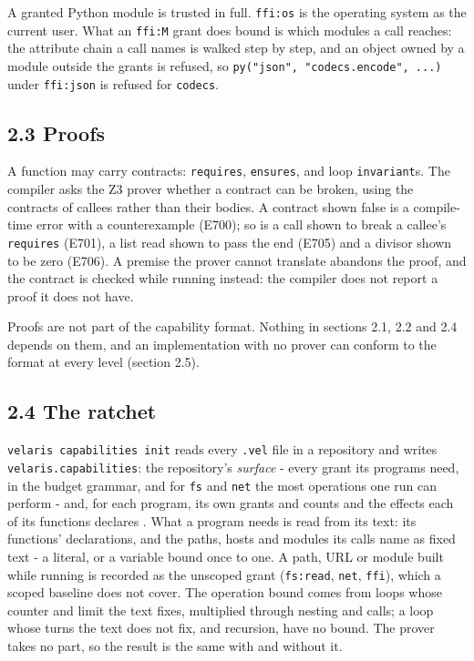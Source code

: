 \documentclass[
]{article}
\begin{document}
A granted Python module is trusted in full. \texttt{ffi:os} is the
operating system as the current user. What an \texttt{ffi:M} grant does
bound is which modules a call reaches: the attribute chain a call names
is walked step by step, and an object owned by a module outside the
grants is refused, so \texttt{py("json",\ "codecs.encode",\ ...)} under
\texttt{ffi:json} is refused for \texttt{codecs}.

\subsection{2.3 Proofs}\label{proofs}

A function may carry contracts: \texttt{requires}, \texttt{ensures}, and
loop \texttt{invariant}s. The compiler asks the Z3 prover
\citep{demoura2008z3} whether a contract can be broken, using the
contracts of callees rather than their bodies. A contract shown false is
a compile-time error with a counterexample (E700); so is a call shown to
break a callee's \texttt{requires} (E701), a list read shown to pass the
end (E705) and a divisor shown to be zero (E706). A premise the prover
cannot translate abandons the proof, and the contract is checked while
running instead: the compiler does not report a proof it does not have.

Proofs are not part of the capability format. Nothing in sections 2.1,
2.2 and 2.4 depends on them, and an implementation with no prover can
conform to the format at every level (section 2.5).

\subsection{2.4 The ratchet}\label{the-ratchet}

\texttt{velaris\ capabilities\ init} reads every \texttt{.vel} file in a
repository and writes \texttt{velaris.capabilities}: the repository's
\emph{surface} - every grant its programs need, in the budget grammar,
and for \texttt{fs} and \texttt{net} the most operations one run can
perform - and, for each program, its own grants and counts and the
effects each of its functions declares \citep[section 9]{velaris_spec}.
What a program needs is read from its text: its functions' declarations,
and the paths, hosts and modules its calls name as fixed text - a
literal, or a variable bound once to one. A path, URL or module built
while running is recorded as the unscoped grant (\texttt{fs:read},
\texttt{net}, \texttt{ffi}), which a scoped baseline does not cover. The
operation bound comes from loops whose counter and limit the text fixes,
multiplied through nesting and calls; a loop whose turns the text does
not fix, and recursion, have no bound. The prover takes no part, so the
result is the same with and without it.
\end{document}
